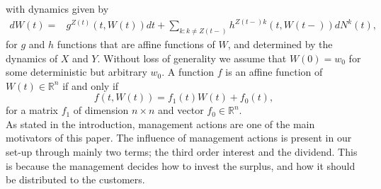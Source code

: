 \documentclass[12pt]{article}
\newcommand{\R}{\mathbb{R}}
\newcommand{\noin}{\noindent}
\theoremstyle{my_thm}
\begin{document}
with dynamics given by
\begin{align*}
dW(t)=& g^{Z(t)}(t,W(t)) dt+ \sum_{k:k\neq Z(t-)} h^{Z(t-)k}(t,W(t-)) dN^k(t),
\end{align*}
for $g$ and $h$ functions that are affine functions of $W$, and determined by the dynamics of $X$ and $Y$. Without loss of generality we assume that $W(0)=w_0$ for some deterministic but arbitrary $w_0$. A function $f$ is an affine function of $W(t)\in \R^n$ if and only if
$$
f(t,W(t))=f_1(t) W(t) + f_0(t),
$$
for a matrix $f_1$ of dimension $n \times n$ and vector $f_0 \in \R^n$.
\\[12pt]
\noin As stated in the introduction, management actions are one of the main motivators of this paper. The influence of management actions is present in our set-up through mainly two terms; the third order interest and the dividend. This is because the management decides how to invest the surplus, and how it should be distributed to the customers.
\end{document}
